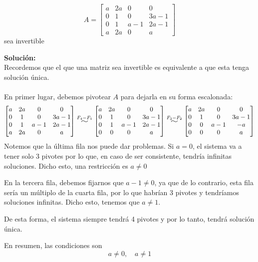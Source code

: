 \documentclass[12pt]{article}
\newenvironment{solucion}
{\begin{mdframed}[backgroundcolor=black!10]
		{\bf Solución:}\\
	}
	{
	\end{mdframed}
}
\newenvironment{preguntas}
{\begin{enumerate}\itemsep12pt
	}
	{
	\end{enumerate}
}
\newcommand{\widesim}[2][1.5]{
	\mathrel{\overset{#2}{\scalebox{#1}[1]{$\sim$}}}
}
\begin{document}
\begin{preguntas}
	$$A = \begin{bmatrix}
	a & 2a & 0 & 0 \\
	0 & 1 & 0 & 3a-1\\
	0 & 1 & a-1 & 2a-1\\
	a & 2a & 0 & a
	\end{bmatrix}$$
	sea invertible
\begin{solucion}
Recordemos que el que una matriz sea invertible es equivalente a que esta tenga solución única.\\\\En primer lugar, debemos pivotear $A$ para dejarla en su forma escalonada:
		$$\begin{bmatrix}
		a & 2a & 0 & 0 \\
		0 & 1 & 0 & 3a-1\\
		0 & 1 & a-1 & 2a-1\\
		a & 2a & 0 & a
		\end{bmatrix} \widesim{F_4-F_1}
		\begin{bmatrix}
		a & 2a & 0 & 0 \\
		0 & 1 & 0 & 3a-1\\
		0 & 1 & a-1 & 2a-1\\
		0 & 0 & 0 & a
		\end{bmatrix} \widesim{F_3-F_2}
		\begin{bmatrix}
		a & 2a & 0 & 0 \\
		0 & 1 & 0 & 3a-1\\
		0 & 0 & a-1 & -a\\
		0 & 0 & 0 & a
		\end{bmatrix}$$
		Notemos que la última fila nos puede dar problemas. Si $a=0$, el sistema va a tener solo 3 pivotes por lo que, en caso de ser consistente, tendría infinitas soluciones. Dicho esto, una restricción es $a\neq 0$
		
		En la tercera fila, debemos fijarnos que $a-1 \neq 0$, ya que de lo contrario, esta fila sería un múltiplo de la cuarta fila, por lo que habrían 3 pivotes y tendríamos soluciones infinitas. Dicho esto, tenemos que $a \neq 1$.
		
		De esta forma, el sistema siempre tendrá 4 pivotes y por lo tanto, tendrá solución única.
		
		En resumen, las condiciones son
		$$a \neq 0, \quad a \neq 1$$
\end{solucion}
\end{preguntas}
\end{document}
